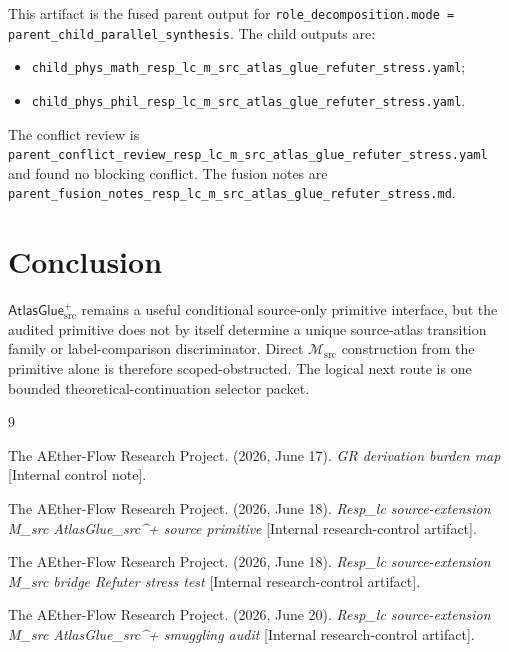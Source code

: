 \documentclass[11pt]{article}
\newcommand{\Msrc}{\mathcal{M}_{\mathrm{src}}}
\newcommand{\AtlasGlue}{\mathsf{AtlasGlue}_{\mathrm{src}}^{+}}
\begin{document}
This artifact is the fused parent output for
\texttt{role\_decomposition.mode = parent\_child\_parallel\_synthesis}. The
child outputs are:
\begin{itemize}
  \item \texttt{child\_phys\_math\_resp\_lc\_m\_src\_atlas\_glue\_refuter\_stress.yaml};
  \item \texttt{child\_phys\_phil\_resp\_lc\_m\_src\_atlas\_glue\_refuter\_stress.yaml}.
\end{itemize}
The conflict review is
\texttt{parent\_conflict\_review\_resp\_lc\_m\_src\_atlas\_glue\_refuter\_stress.yaml}
and found no blocking conflict. The fusion notes are
\texttt{parent\_fusion\_notes\_resp\_lc\_m\_src\_atlas\_glue\_refuter\_stress.md}.

\section{Conclusion}

\(\AtlasGlue\) remains a useful conditional source-only primitive interface,
but the audited primitive does not by itself determine a unique source-atlas
transition family or label-comparison discriminator. Direct \(\Msrc\)
construction from the primitive alone is therefore scoped-obstructed. The
logical next route is one bounded theoretical-continuation selector packet.

\begin{thebibliography}{9}

The AEther-Flow Research Project. (2026, June 17). \emph{GR derivation burden
map} [Internal control note].

The AEther-Flow Research Project. (2026, June 18). \emph{Resp\_lc
source-extension M\_src AtlasGlue\_src\^{}+ source primitive} [Internal
research-control artifact].

The AEther-Flow Research Project. (2026, June 18). \emph{Resp\_lc
source-extension M\_src bridge Refuter stress test} [Internal
research-control artifact].

The AEther-Flow Research Project. (2026, June 20). \emph{Resp\_lc
source-extension M\_src AtlasGlue\_src\^{}+ smuggling audit} [Internal
research-control artifact].

\end{thebibliography}
\end{document}
